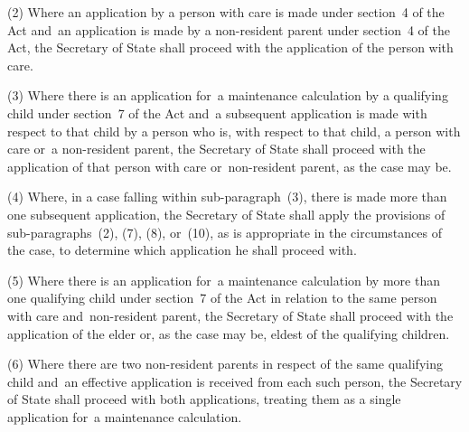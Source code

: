 \documentclass[12pt,a4paper]{article}
\begin{document}
(2) Where an application by a person with care is made under section~4 of the Act 
and~an application is made by a non-resident parent under section~4 of the Act, the Secretary of State shall proceed with the application of the person with care.

(3) Where there is an application for~a maintenance calculation by a qualifying child under section~7 of the Act and~a subsequent application is made with respect to that child by a person who is, with respect to that child, a person with care or~a non-resident parent, the Secretary of State shall proceed with the application of that person with care or~non-resident parent, as the case may be.

(4) Where, in a case falling within sub-paragraph~(3), there is made more than one subsequent application, the Secretary of State shall apply the provisions of sub-paragraphs~(2), (7), (8), or~(10), as is appropriate in the circumstances of the case, to determine which application he shall proceed with.

(5) Where there is an application for~a maintenance calculation by more than one qualifying child under section~7 of the Act in relation to the same person with care and~non-resident parent, the Secretary of State shall proceed with the application of the elder or, as the case may be, eldest of the qualifying children.

(6) Where there are two non-resident parents in respect of the same qualifying child and~an effective application is received from each such person, the Secretary of State shall proceed with both applications, treating them as a single application for~a maintenance calculation.

\end{document}
